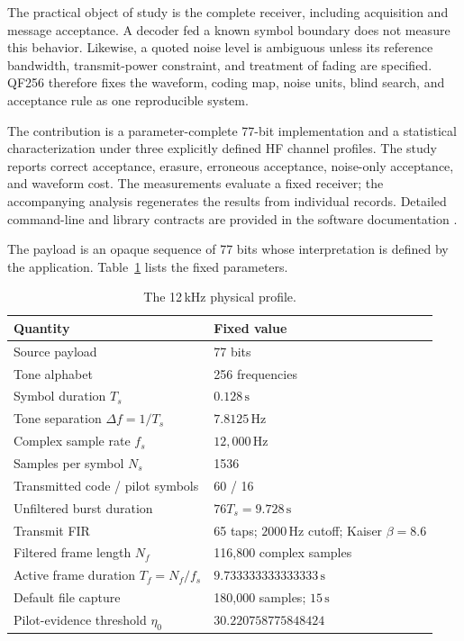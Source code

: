 \documentclass[11pt,a4paper]{article}
\newcommand{\Hz}{\,\mathrm{Hz}}
\newcommand{\seconds}{\,\mathrm{s}}
\newcommand{\Gate}{30.220758775848424}
\begin{document}
The practical object of study is the complete receiver, including acquisition
and message acceptance. A decoder fed a known symbol boundary does not
measure this behavior. Likewise, a quoted noise level is ambiguous unless
its reference bandwidth, transmit-power constraint, and treatment of fading
are specified. QF256 therefore fixes the waveform, coding map, noise units,
blind search, and acceptance rule as one reproducible system.

The contribution is a parameter-complete 77-bit implementation and a
statistical characterization under three explicitly defined HF channel
profiles. The study reports correct acceptance, erasure, erroneous acceptance,
noise-only acceptance, and waveform cost. The measurements evaluate
a fixed receiver; the accompanying analysis regenerates the results from
individual records. Detailed command-line and library contracts are provided
in the software documentation \cite{software}.

The payload is an opaque sequence of 77 bits whose interpretation is defined
by the application. Table~\ref{tab:profile} lists the fixed parameters.

\begin{table}[ht]
\centering
\begin{tabular}{@{}ll@{}}
\toprule
Quantity & Fixed value \\
\midrule
Source payload & 77 bits \\
Tone alphabet & 256 frequencies \\
Symbol duration $T_s$ & $0.128\seconds$ \\
Tone separation $\Delta f=1/T_s$ & $7.8125\Hz$ \\
Complex sample rate $f_s$ & $12{,}000\Hz$ \\
Samples per symbol $N_s$ & 1536 \\
Transmitted code / pilot symbols & 60 / 16 \\
Unfiltered burst duration & $76T_s=9.728\seconds$ \\
Transmit FIR & 65 taps; $2000\Hz$ cutoff; Kaiser $\beta=8.6$ \\
Filtered frame length $N_f$ & 116,800 complex samples \\
Active frame duration $T_f=N_f/f_s$ & $9.733333333333333\seconds$ \\
Default file capture & 180,000 samples; $15\seconds$ \\
Pilot-evidence threshold $\eta_0$ & $\Gate$ \\
\bottomrule
\end{tabular}
\caption{The 12\,kHz physical profile.}
\label{tab:profile}
\end{table}
\end{document}
